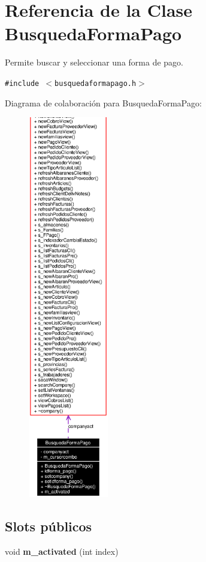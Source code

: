 \section{Referencia de la Clase Busqueda\-Forma\-Pago}
\label{classBusquedaFormaPago}
Permite buscar y seleccionar una forma de pago.  


{\tt \#include $<$busquedaformapago.h$>$}

Diagrama de colaboraci\'{o}n para Busqueda\-Forma\-Pago:\begin{figure}[H]
\begin{center}
\leavevmode
\includegraphics[width=99pt]{classBusquedaFormaPago__coll__graph}
\end{center}
\end{figure}
\subsection*{Slots p\'{u}blicos}
\begin{CompactItemize}
\item 
void {\bf m\_\-activated} (int index)\label{classBusquedaFormaPago_i0}

\end{CompactItemize}
